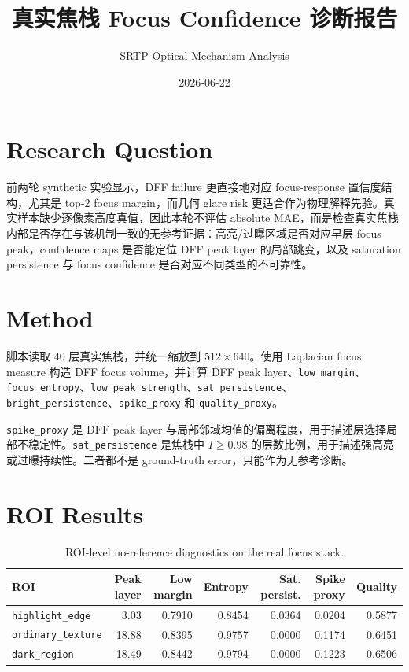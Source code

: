 \documentclass[11pt]{article}
\title{真实焦栈 Focus Confidence 诊断报告}
\author{SRTP Optical Mechanism Analysis}
\date{2026-06-22}
\begin{document}
\maketitle

\section{Research Question}

前两轮 synthetic 实验显示，DFF failure 更直接地对应 focus-response 置信度结构，尤其是 top-2 focus margin，而几何 glare risk 更适合作为物理解释先验。真实样本缺少逐像素高度真值，因此本轮不评估 absolute MAE，而是检查真实焦栈内部是否存在与该机制一致的无参考证据：高亮/过曝区域是否对应早层 focus peak，confidence maps 是否能定位 DFF peak layer 的局部跳变，以及 saturation persistence 与 focus confidence 是否对应不同类型的不可靠性。

\section{Method}

脚本读取 40 层真实焦栈，并统一缩放到 $512 \times 640$。使用 Laplacian focus measure 构造 DFF focus volume，并计算 DFF peak layer、\texttt{low\_margin}、\texttt{focus\_entropy}、\texttt{low\_peak\_strength}、\texttt{sat\_persistence}、\texttt{bright\_persistence}、\texttt{spike\_proxy} 和 \texttt{quality\_proxy}。

\texttt{spike\_proxy} 是 DFF peak layer 与局部邻域均值的偏离程度，用于描述层选择局部不稳定性。\texttt{sat\_persistence} 是焦栈中 $I \geq 0.98$ 的层数比例，用于描述强高亮或过曝持续性。二者都不是 ground-truth error，只能作为无参考诊断。

\section{ROI Results}

\begin{table}[htbp]
\centering
\small
\begin{tabular}{lrrrrrr}
\toprule
ROI & Peak layer & Low margin & Entropy & Sat. persist. & Spike proxy & Quality \\
\midrule
\texttt{highlight\_edge} & 3.03 & 0.7910 & 0.8454 & 0.0364 & 0.0204 & 0.5877 \\
\texttt{ordinary\_texture} & 18.88 & 0.8395 & 0.9757 & 0.0000 & 0.1174 & 0.6451 \\
\texttt{dark\_region} & 18.49 & 0.8442 & 0.9794 & 0.0000 & 0.1223 & 0.6506 \\
\bottomrule
\end{tabular}
\caption{ROI-level no-reference diagnostics on the real focus stack.}
\end{table}
\end{document}
